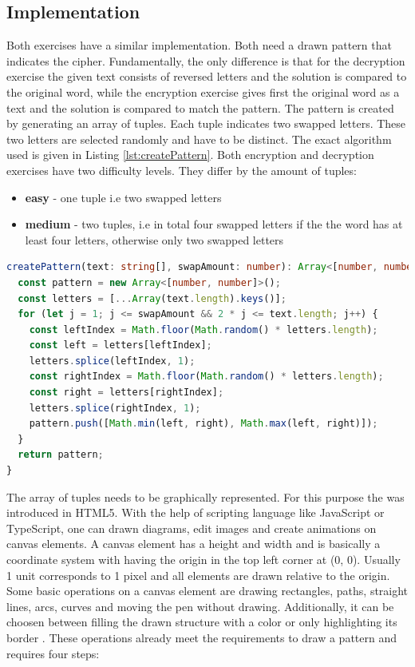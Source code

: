 \subsection{Implementation}

Both exercises have a similar implementation. Both need a drawn pattern that indicates the cipher. Fundamentally, the only difference is that for the decryption exercise the given text consists of reversed letters and the solution is compared to the original word, while the encryption exercise gives first the original word as a text and the solution is compared to match the pattern. 
The pattern is created by generating an array of tuples. Each tuple indicates two swapped letters. These two letters are selected randomly and have to be distinct. The exact algorithm used is given in Listing \ref{lst:createPattern}.
Both encryption and decryption exercises have two difficulty levels. They differ by the amount of tuples:

\begin{itemize}
    \item \textbf{easy} - one tuple i.e two swapped letters 
    \item \textbf{medium} - two tuples, i.e in total four swapped letters if the the word has at least four letters, otherwise only two swapped letters 
\end{itemize}

\begin{lstlisting}[language=TypeScript,caption={Algorithm to generate an array of distinc tuples of given size},label={lst:createPattern}]
createPattern(text: string[], swapAmount: number): Array<[number, number]> {
  const pattern = new Array<[number, number]>();
  const letters = [...Array(text.length).keys()];
  for (let j = 1; j <= swapAmount && 2 * j <= text.length; j++) {
    const leftIndex = Math.floor(Math.random() * letters.length);
    const left = letters[leftIndex];
    letters.splice(leftIndex, 1);
    const rightIndex = Math.floor(Math.random() * letters.length);
    const right = letters[rightIndex];
    letters.splice(rightIndex, 1);
    pattern.push([Math.min(left, right), Math.max(left, right)]);
  }
  return pattern;
}
\end{lstlisting}

The array of tuples needs to be graphically represented. For this purpose the  was introduced in HTML5. With the help of scripting language like JavaScript or TypeScript, one can drawn diagrams, edit images and create animations on canvas elements. A canvas element has a height and width and is basically a coordinate system with having the origin in the top left corner at (0, 0). Usually 1 unit corresponds to 1 pixel and all elements are drawn relative to the origin. Some basic operations on a canvas element are drawing rectangles, paths, straight lines, arcs, curves and moving the pen without drawing. Additionally, it can be choosen between filling the drawn structure with a color or only highlighting its border \cite{MDNWebDocs}. These operations already meet the requirements to draw a pattern and requires four steps: 

